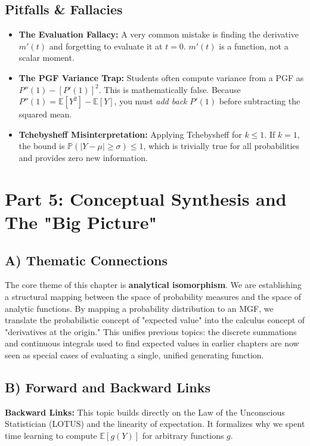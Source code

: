\documentclass[11pt, a4paper]{article}
\theoremstyle{definition}
\theoremstyle{remark}
\newcommand{\E}{\mathbb{E}}
\newcommand{\Prob}{\mathbb{P}}
\begin{document}
\subsection{Pitfalls \& Fallacies}
\begin{itemize}
    \item \textbf{The Evaluation Fallacy:} A very common mistake is finding the derivative $m'(t)$ and forgetting to evaluate it at $t=0$. $m'(t)$ is a function, not a scalar moment.
    \item \textbf{The PGF Variance Trap:} Students often compute variance from a PGF as $P''(1) - [P'(1)]^2$. This is mathematically false. Because $P''(1) = \E[Y^2] - \E[Y]$, you must \textit{add back} $P'(1)$ before subtracting the squared mean.
    \item \textbf{Tchebysheff Misinterpretation:} Applying Tchebysheff for $k \le 1$. If $k=1$, the bound is $\Prob(|Y-\mu| \ge \sigma) \le 1$, which is trivially true for all probabilities and provides zero new information.
\end{itemize}

\newpage
\section{Part 5: Conceptual Synthesis and The "Big Picture"}

\subsection{A) Thematic Connections}
The core theme of this chapter is \textbf{analytical isomorphism}. We are establishing a structural mapping between the space of probability measures and the space of analytic functions. By mapping a probability distribution to an MGF, we translate the probabilistic concept of "expected value" into the calculus concept of "derivatives at the origin." This unifies previous topics: the discrete summations and continuous integrals used to find expected values in earlier chapters are now seen as special cases of evaluating a single, unified generating function.

\subsection{B) Forward and Backward Links}
\textbf{Backward Links:} This topic builds directly on the Law of the Unconscious Statistician (LOTUS) and the linearity of expectation. It formalizes why we spent time learning to compute $\E[g(Y)]$ for arbitrary functions $g$.
\end{document}
